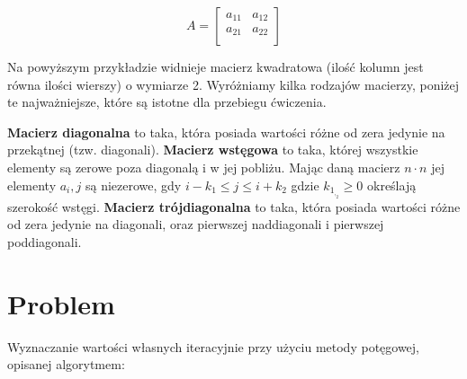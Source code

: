 \documentclass{article}
\begin{document}
\newline
\begin{center}
$$
{A} =
\left[ \begin{array}{cc}
a_{11} & a_{12} \\
a_{21} & a_{22} \\
\end{array} \right]
$$

\end{center}
Na powyższym przykładzie widnieje macierz kwadratowa (ilość kolumn jest równa ilości wierszy) o
wymiarze 2. Wyróżniamy kilka rodzajów macierzy, poniżej te najważniejsze, które są istotne dla
przebiegu ćwiczenia.

\newline\newline
\textbf{Macierz diagonalna} to taka, która posiada wartości różne od zera jedynie na przekątnej (tzw. diagonali).
\newline\newline
\textbf{Macierz wstęgowa}  to taka, której wszystkie elementy są zerowe poza diagonalą i w jej pobliżu. Mając
daną macierz $n \cdot n$ jej elementy $a_i,j$ są niezerowe, gdy $i-k_1 \leq j \leq i+k_2$ gdzie $k_1_,_2 \geq 0$ określają
szerokość wstęgi.
\newline\newline
\textbf{Macierz trójdiagonalna}  to taka, która posiada wartości różne od zera jedynie na diagonali, oraz
pierwszej naddiagonali i pierwszej poddiagonali.

\section{Problem}
Wyznaczanie wartości własnych iteracyjnie przy użyciu metody potęgowej, opisanej algorytmem:
\end{document}
